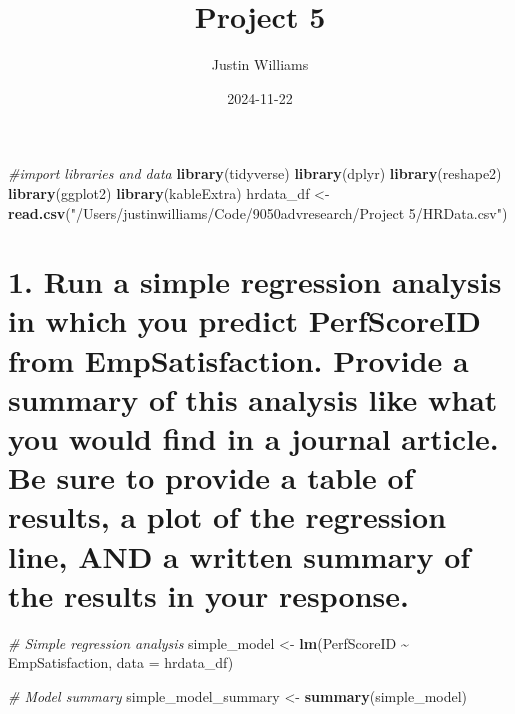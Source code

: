 \documentclass[
]{article}
\title{Project 5}
\author{Justin Williams}
\date{2024-11-22}
\newenvironment{Shaded}{\begin{snugshade}}{\end{snugshade}}
\newcommand{\AttributeTok}[1]{\textcolor[rgb]{0.13,0.29,0.53}{#1}}
\newcommand{\CommentTok}[1]{\textcolor[rgb]{0.56,0.35,0.01}{\textit{#1}}}
\newcommand{\FunctionTok}[1]{\textcolor[rgb]{0.13,0.29,0.53}{\textbf{#1}}}
\newcommand{\NormalTok}[1]{#1}
\newcommand{\OtherTok}[1]{\textcolor[rgb]{0.56,0.35,0.01}{#1}}
\newcommand{\SpecialCharTok}[1]{\textcolor[rgb]{0.81,0.36,0.00}{\textbf{#1}}}
\newcommand{\StringTok}[1]{\textcolor[rgb]{0.31,0.60,0.02}{#1}}
\begin{document}
\maketitle

\begin{Shaded}
\begin{Highlighting}[]
\CommentTok{\#import libraries and data}
\FunctionTok{library}\NormalTok{(tidyverse)}
\FunctionTok{library}\NormalTok{(dplyr)}
\FunctionTok{library}\NormalTok{(reshape2)}
\FunctionTok{library}\NormalTok{(ggplot2)}
\FunctionTok{library}\NormalTok{(kableExtra)}
\NormalTok{hrdata\_df }\OtherTok{\textless{}{-}} \FunctionTok{read.csv}\NormalTok{(}\StringTok{"/Users/justinwilliams/Code/9050advresearch/Project 5/HRData.csv"}\NormalTok{)}
\end{Highlighting}
\end{Shaded}

\section{1. Run a simple regression analysis in which you predict
PerfScoreID from EmpSatisfaction. Provide a summary of this analysis
like what you would find in a journal article. Be sure to provide a
table of results, a plot of the regression line, AND a written summary
of the results in your
response.}\label{run-a-simple-regression-analysis-in-which-you-predict-perfscoreid-from-empsatisfaction.-provide-a-summary-of-this-analysis-like-what-you-would-find-in-a-journal-article.-be-sure-to-provide-a-table-of-results-a-plot-of-the-regression-line-and-a-written-summary-of-the-results-in-your-response.}

\begin{Shaded}
\begin{Highlighting}[]
\CommentTok{\# Simple regression analysis}
\NormalTok{simple\_model }\OtherTok{\textless{}{-}} \FunctionTok{lm}\NormalTok{(PerfScoreID }\SpecialCharTok{\textasciitilde{}}\NormalTok{ EmpSatisfaction, }\AttributeTok{data =}\NormalTok{ hrdata\_df)}

\CommentTok{\# Model summary}
\NormalTok{simple\_model\_summary }\OtherTok{\textless{}{-}} \FunctionTok{summary}\NormalTok{(simple\_model)}
\end{Highlighting}
\end{Shaded}
\end{document}
